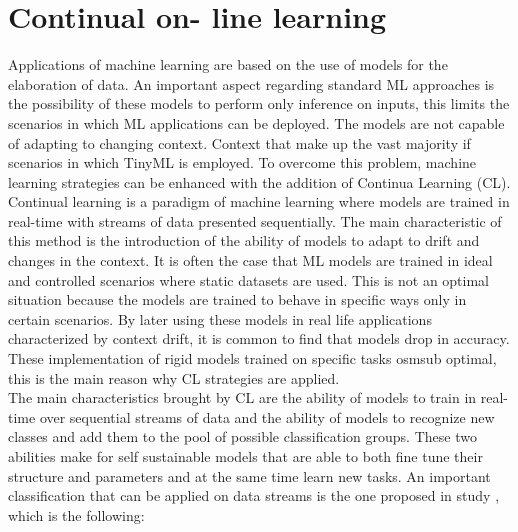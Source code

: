 \documentclass[12pt]{report}
\begin{document}
\section{Continual on- line learning}
Applications of machine learning are based on the use of models for the elaboration of data. An important aspect regarding standard ML approaches is the possibility of these models to perform only inference on inputs, this limits the scenarios in which ML applications can be deployed. The models are not capable of adapting to changing context. Context that make up the vast majority if scenarios in which TinyML is employed. To overcome this problem, machine learning strategies can be enhanced with the addition of Continua Learning (CL). \\
Continual learning is a paradigm of machine learning where models are trained in real-time with streams of data presented sequentially. The main characteristic of this method is the introduction of the ability of models to adapt to drift and changes in the context. It is often the case that ML models are trained in ideal and controlled scenarios where static datasets are used. This is not an optimal situation because the models are trained to behave in specific ways only in certain scenarios. By later using these models in real life applications characterized by context drift, it is common to find that models drop in accuracy. These implementation of rigid models trained on specific tasks osmsub optimal, this is the main reason why CL strategies are applied.\\
The main characteristics brought by CL are the ability of models to train in real-time over sequential streams of data and the ability of models to recognize new classes and add them to the pool of possible classification groups. These two abilities make for self sustainable models that are able to both fine tune their structure and parameters and at the same time learn new tasks. An important classification that can be applied on data streams is the one proposed in study \autocite{}, which is the following:
\end{document}
